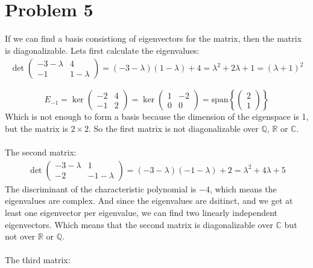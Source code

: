\documentclass{article}
\begin{document}
\section*{Problem 5}
If we can find a basis consistiong of eigenvectors for the matrix, then the matrix is diagonalizable.
Lets first calculate the eigenvalues:
\begin{align*}
\det\begin{pmatrix}
-3 - \lambda & 4 \\
-1 & 1 - \lambda
\end{pmatrix} = (-3 - \lambda)(1 - \lambda) + 4 = \lambda^2 + 2\lambda + 1 = (\lambda + 1)^2
\end{align*}

\[
    E_{-1} = \ker\begin{pmatrix}
                    -2 & 4 \\
                    -1 & 2
                \end{pmatrix} = \ker\begin{pmatrix}
                    1 & -2 \\
                    0 & 0
                \end{pmatrix} = \text{span}\left\{\begin{pmatrix}
                    2 \\
                    1
                \end{pmatrix}\right\}
\]
Which is not enough to form a basis because the dimension of the eigenspace is 1, but the matrix is \(2 \times 2\).
So the first matrix is not diagonalizable over \(\mathbb{Q}\), \(\mathbb{R}\) or \(\mathbb{C}\).
\\
\\
The second matrix:
\begin{align*}
\det\begin{pmatrix}
-3 - \lambda & 1 \\
-2 & -1 - \lambda
\end{pmatrix} = (-3 - \lambda)(-1 - \lambda) + 2 = \lambda^2 + 4\lambda + 5
\end{align*}
The discriminant of the characteristic polynomial is \(-4\), which means the eigenvalues are complex. And since the eigenvalues are dsitinct,
and we get at least one eigenvector per eigenvalue, we can find two linearly independent eigenvectors. Which means that the second matrix is diagonalizable over \(\mathbb{C}\)
but not over \(\mathbb{R}\) or \(\mathbb{Q}\).
\\
\\
The third matrix:
\end{document}
